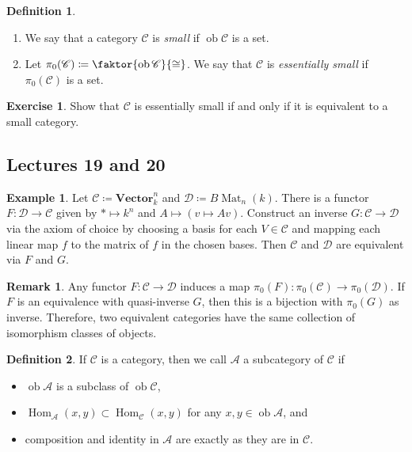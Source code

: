 \documentclass[10pt,letterpaper,cm]{nupset}
\theoremstyle{definition}
\newtheorem*{definition}{Definition}
\newtheorem{exmp}{Example}
\newtheorem{remark}{Remark}
\newtheorem{exercise}{Exercise}
\newcommand{\1}{\mathbf{1}}
\renewcommand{\a}{\mathscr{A}}
\renewcommand{\c}{\mathscr{C}}
\renewcommand{\d}{\mathscr{D}}
\newcommand{\0}{\vec 0}
\DeclareMathOperator{\ob}{ob}
\DeclareMathOperator{\Mat}{Mat}
\DeclareMathOperator{\Hom}{Hom}
\begin{document}
\begin{definition} $ $
\begin{enumerate}
\item We say that a category $\c$ is \textit{small} if $\ob{\c}$ is a set.
\item Let $\pi_0(\c) \coloneqq  \faktor{\ob \c}{\cong}$. We say that $\c$ is \textit{essentially small} if $\pi_0(\c)$ is a set.
\end{enumerate}
\end{definition}

\begin{exercise}
Show that $\c$ is essentially small  if and only if it is equivalent to a small category. 
\end{exercise}

\subsection{Lectures 19 and 20}

\begin{exmp} 
Let $\c \coloneqq  \mathbf{Vector}_k^n$ and $\d \coloneqq  B\Mat_n(k)$. There is a functor $F : \d \to \c$ given by $\ast \mapsto k^n$ and $A \mapsto (v \mapsto Av)$. Construct an inverse $G: \c \to \d$ via the axiom of choice by choosing a basis for each $V \in \c$ and mapping each linear map $f$ to the matrix of $f$ in the chosen bases. Then $\c$ and $\d$ are equivalent via $F$ and $G$.
\end{exmp}

\begin{remark}
Any functor $F: \c \to \d$ induces a map $\pi_0(F) : \pi_0(\c) \to \pi_0(\d)$. If $F$ is an equivalence with quasi-inverse $G$, then this is a bijection with $\pi_0(G)$ as inverse. Therefore, two equivalent categories have the same collection of isomorphism classes of objects.
\end{remark}


\begin{definition}
If $\c$ is a category, then we call $\a$ a subcategory of $\c$ if
\begin{itemize}
\item $\ob{\a}$ is a subclass of $\ob{\c}$, 
\item $\Hom_{\a}(x,y) \subset \Hom_{\c}(x,y)$ for any $x,y\in \ob{\a}$, and
\item composition and identity in $\a$ are exactly as they are in $\c$.
\end{itemize}
\end{definition}
\end{document}

